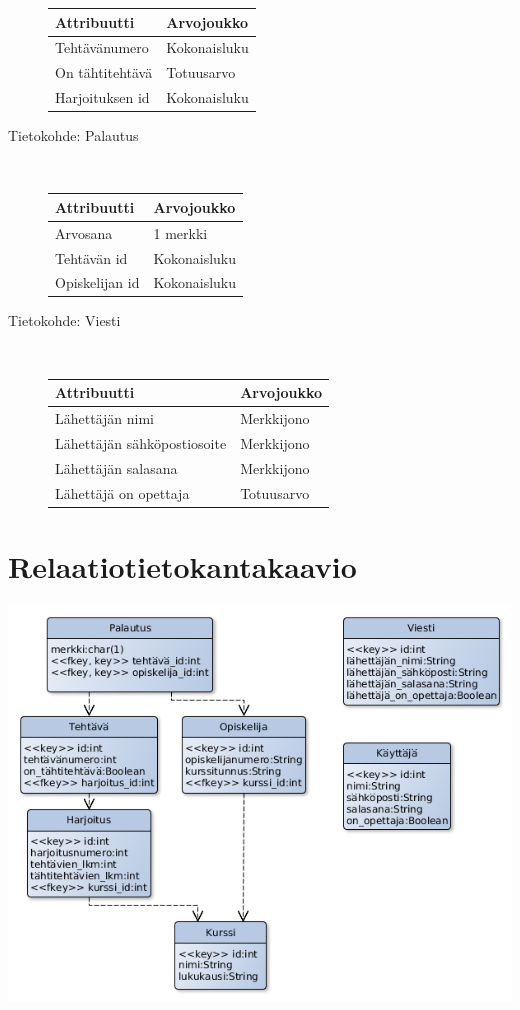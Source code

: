 \documentclass[a4paper,12pt, titlepage]{article}
\begin{document}
\begin{description}
	\begin{tabular}{| l | l |}
	\hline
	Attribuutti & Arvojoukko \\ \hline
	Tehtävänumero & Kokonaisluku \\ \hline
	On tähtitehtävä & Totuusarvo \\ \hline
	Harjoituksen id & Kokonaisluku \\ \hline
	\end{tabular}
	\item[Tietokohde: Palautus] \hfill \\
	\begin{tabular}{| l | l |}
	\hline
	Attribuutti & Arvojoukko \\ \hline
	Arvosana & 1 merkki \\ \hline
	Tehtävän id & Kokonaisluku \\ \hline
	Opiskelijan id & Kokonaisluku \\ \hline
	\end{tabular}
	\item[Tietokohde: Viesti] \hfill \\
	\begin{tabular}{| l | l |}
	\hline
	Attribuutti & Arvojoukko \\ \hline
	Lähettäjän nimi & Merkkijono \\ \hline
	Lähettäjän sähköpostiosoite & Merkkijono \\ \hline
	Lähettäjän salasana & Merkkijono \\ \hline
	Lähettäjä on opettaja & Totuusarvo \\ \hline
	\end{tabular}
\end{description}

\section{Relaatiotietokantakaavio}

\includegraphics[scale=0.5]{relaatiokaavio}
\end{document}
